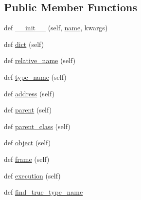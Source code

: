 \subsection*{Public Member Functions}
\begin{DoxyCompactItemize}
\item 
def \hyperlink{classmemoryoracle_1_1descriptions_1_1MemoryDescription_a12899787599461edfbcdaa43e057eaef}{\+\_\+\+\_\+init\+\_\+\+\_\+} (self, \hyperlink{classmemoryoracle_1_1descriptions_1_1Description_a4b27c3ae1ef0ab35ec0f990fa553b8b3}{name}, kwargs)
\item 
def \hyperlink{classmemoryoracle_1_1descriptions_1_1MemoryDescription_aebd60209e758d2affe3b637a3eb4dca2}{dict} (self)
\item 
def \hyperlink{classmemoryoracle_1_1descriptions_1_1MemoryDescription_a342c00383637914cc5b77d165016a41f}{relative\+\_\+name} (self)
\item 
def \hyperlink{classmemoryoracle_1_1descriptions_1_1MemoryDescription_aa67a52a7ce77ac27d2d2e2d7818c9ffc}{type\+\_\+name} (self)
\item 
def \hyperlink{classmemoryoracle_1_1descriptions_1_1MemoryDescription_a17ade99360fb76de33af7cfa3181198b}{address} (self)
\item 
def \hyperlink{classmemoryoracle_1_1descriptions_1_1MemoryDescription_a15bf69de6eaa0dad24b464f388bf1bef}{parent} (self)
\item 
def \hyperlink{classmemoryoracle_1_1descriptions_1_1MemoryDescription_ab59ccafd4b30da2dea04b6a563f9ec65}{parent\+\_\+class} (self)
\item 
def \hyperlink{classmemoryoracle_1_1descriptions_1_1MemoryDescription_a0fc58900317d1e723b6352005e163aef}{object} (self)
\item 
def \hyperlink{classmemoryoracle_1_1descriptions_1_1MemoryDescription_a77ab2795f43cc1b5ccc849f55d79b7be}{frame} (self)
\item 
def \hyperlink{classmemoryoracle_1_1descriptions_1_1MemoryDescription_a2fd120fa38b13cd11940ec83eb8d04f3}{execution} (self)
\item 
def \hyperlink{classmemoryoracle_1_1descriptions_1_1MemoryDescription_a37bafcc7560597b64089937e3c33bb60}{find\+\_\+true\+\_\+type\+\_\+name}
\end{DoxyCompactItemize}
